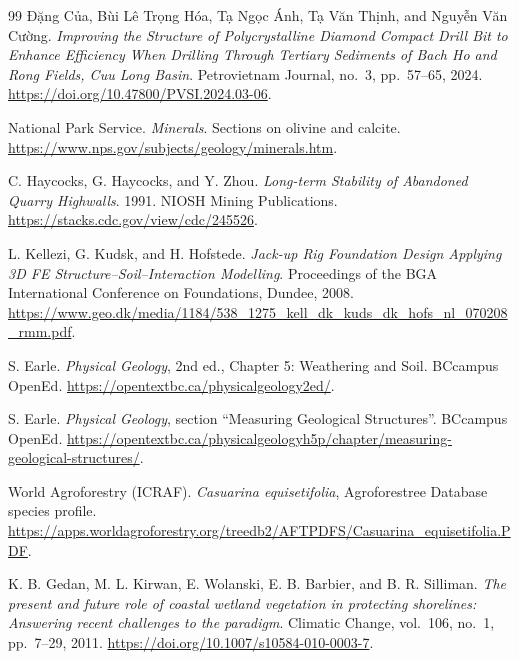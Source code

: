 \documentclass[11pt, a4paper]{article}
\begin{document}
\begin{thebibliography}{99}
 Đặng Của, Bùi Lê Trọng Hóa, Tạ Ngọc Ánh, Tạ Văn Thịnh, and Nguyễn Văn Cường. \textit{Improving the Structure of Polycrystalline Diamond Compact Drill Bit to Enhance Efficiency When Drilling Through Tertiary Sediments of Bach Ho and Rong Fields, Cuu Long Basin}. Petrovietnam Journal, no.\ 3, pp.\ 57--65, 2024. \url{https://doi.org/10.47800/PVSI.2024.03-06}.


 National Park Service. \textit{Minerals}. Sections on olivine and calcite. \url{https://www.nps.gov/subjects/geology/minerals.htm}.

 C. Haycocks, G. Haycocks, and Y. Zhou. \textit{Long-term Stability of Abandoned Quarry Highwalls}. 1991. NIOSH Mining Publications. \url{https://stacks.cdc.gov/view/cdc/245526}.

 L. Kellezi, G. Kudsk, and H. Hofstede. \textit{Jack-up Rig Foundation Design Applying 3D FE Structure--Soil--Interaction Modelling}. Proceedings of the BGA International Conference on Foundations, Dundee, 2008. \url{https://www.geo.dk/media/1184/538_1275_kell_dk_kuds_dk_hofs_nl_070208_rmm.pdf}.

 S. Earle. \textit{Physical Geology}, 2nd ed., Chapter 5: Weathering and Soil. BCcampus OpenEd. \url{https://opentextbc.ca/physicalgeology2ed/}.

 S. Earle. \textit{Physical Geology}, section ``Measuring Geological Structures''. BCcampus OpenEd. \url{https://opentextbc.ca/physicalgeologyh5p/chapter/measuring-geological-structures/}.

 World Agroforestry (ICRAF). \textit{Casuarina equisetifolia}, Agroforestree Database species profile. \url{https://apps.worldagroforestry.org/treedb2/AFTPDFS/Casuarina_equisetifolia.PDF}.

 K. B. Gedan, M. L. Kirwan, E. Wolanski, E. B. Barbier, and B. R. Silliman. \textit{The present and future role of coastal wetland vegetation in protecting shorelines: Answering recent challenges to the paradigm}. Climatic Change, vol.\ 106, no.\ 1, pp.\ 7--29, 2011. \url{https://doi.org/10.1007/s10584-010-0003-7}.

\end{thebibliography}
\end{document}
